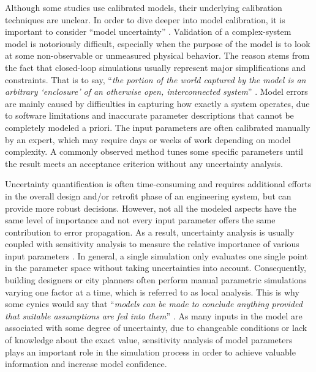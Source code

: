 Although some studies use calibrated models, their underlying calibration techniques are unclear. In order to dive deeper into model calibration, it is important to consider ``model uncertainty'' \cite{hopfe2011uncertainty}. Validation of a complex-system model is notoriously difficult, especially when the purpose of the model is to look at some non-observable or unmeasured physical behavior. The reason stems from the fact that closed-loop simulations usually represent major simplifications and constraints. That is to say, ``\textit{the portion of the world captured by the model is an arbitrary `enclosure' of an otherwise open, interconnected system}'' \cite{rosen1991life}. Model errors are mainly caused by difficulties in capturing how exactly a system operates, due to software limitations and inaccurate parameter descriptions that cannot be completely modeled a priori. The input parameters are often calibrated manually by an expert, which may require days or weeks of work depending on model complexity. A commonly observed method tunes some specific parameters until the result meets an acceptance criterion without any uncertainty analysis.

Uncertainty quantification is often time-consuming and requires additional efforts in the overall design and/or retrofit phase of an engineering system, but can provide more robust decisions. However, not all the modeled aspects have the same level of importance and not every input parameter offers the same contribution to error propagation. As a result, uncertainty analysis is usually coupled with sensitivity analysis to measure the relative importance of various input parameters \cite{tian2013review}. In general, a single simulation only evaluates one single point in the parameter space without taking uncertainties into account. Consequently, building designers or city planners often perform manual parametric simulations varying one factor at a time, which is referred to as local analysis. This is why some cynics would say that ``\textit{models can be made to conclude anything provided that suitable assumptions are fed into them}'' \cite{economist1998fallout}. As many inputs in the model are associated with some degree of uncertainty, due to changeable conditions or lack of knowledge about the exact value, sensitivity analysis of model parameters plays an important role in the simulation process in order to achieve valuable information and increase model confidence.

